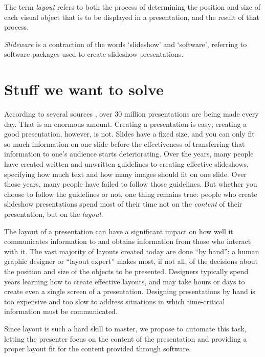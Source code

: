    The term \emph{layout} refers to both the process of determining the
   position and size of each visual object that is to be displayed in a
   presentation, and the result of that process.

   \emph{Slideware} is a contraction of the words `slideshow' and `software',
   referring to software packages used to create slideshow presentations.

  \section{Stuff we want to solve}


   According to several sources \citep{parker-1, drucker-1, bajaj-1}, over 30
   million \ppt presentations are being made every day. That is an enormous
   amount. Creating a \ppt presentation is easy; creating a good \ppt
   presentation, however, is not. Slides have a fixed size, and you can only
   fit so much information on one slide before the effectiveness of
   transferring that information to one's audience starts deteriorating. Over
   the years, many people have created written and unwritten guidelines to
   creating effective slideshows, specifying how much text and how many images
   should fit on one slide. Over those years, many people have failed to follow
   those guidelines. But whether you choose to follow the guidelines or
   not, one thing remains true: people who create slideshow presentations spend
   most of their time not on the \emph{content} of their presentation, but on the
   \emph{layout}.

   The layout of a presentation can have a significant impact on how well it
   communicates information to and obtains information from those who interact
   with it. The vast majority of layouts created today are done ``by hand'': a
   human graphic designer or ``layout expert'' makes most, if not all, of the
   decisions about the position and size of the objects to be presented.
   Designers typically spend years learning how to create effective layouts,
   and may take hours or days to create even a single screen of a presentation.
   Designing presentations by hand is too expensive and too slow to address
   situations in which time-critical information must be communicated.

   Since layout is such a hard skill to master, we propose to automate this
   task, letting the presenter focus on the content of the presentation and
   providing a proper layout fit for the content provided through software.

